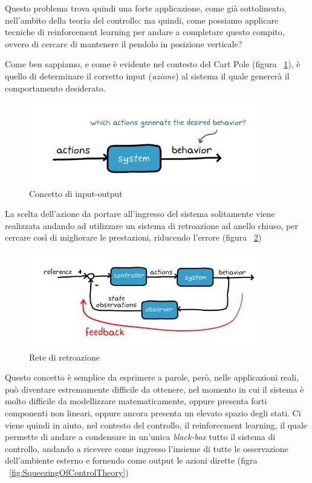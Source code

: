 Questo problema trova quindi una forte applicazione, come già sottolineato, nell'ambito della teoria del controllo: ma quindi, come possiamo applicare tecniche di reinforcement learning per andare a completare questo compito, ovvero di cercare di mantenere il pendolo in posizione verticale?

Come ben sappiamo, e come è evidente nel contesto del Cart Pole (figura ~\ref{fig:ActionBehaviour}), è quello di determinare il corretto input (\textit{azione}) al sistema il quale genererà il comportamento desiderato.

\begin{figure}[!h]
	\centering
	\includegraphics[width=0.9\textwidth]{Immagini/In_Out.JPG}
	\caption{Concetto di input-output}
	\label{fig:ActionBehaviour}
\end{figure}

La scelta dell'azione da portare all'ingresso del sistema solitamente viene realizzata andando ad utilizzare un sistema di retroazione ad anello chiuso, per cercare così di migliorare le prestazioni, riducendo l'errore (figura ~\ref{fig:ControlTheory})

\begin{figure}[!h]
	\centering
	\includegraphics[width=0.9\textwidth]{Immagini/ControlTheory.JPG}
	\caption{Rete di retroazione}
	\label{fig:ControlTheory}
\end{figure}
Questo concetto è semplice da esprimere a parole, però, nelle applicazioni reali, può diventare estremamente difficile da ottenere, nel momento in cui il sistema è molto difficile da modellizzare matematicamente, oppure presenta forti componenti non lineari, oppure ancora presenta un elevato spazio degli stati.
Ci viene quindi in aiuto, nel contesto del controllo, il reinforcement learning, il quale permette di andare a condensare in un'unica \textit{black-box} tutto il sistema di controllo, andando a ricevere come ingresso l'insieme di tutte le osservazione dell'ambiente esterno e fornendo come output le azioni dirette (figra ~\ref{fig:SqueezingOfControlTheory})

